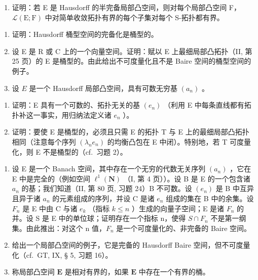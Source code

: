 \begin{enumerate}
\def\labelenumi{\arabic{enumi})}
\setcounter{enumi}{12}
\tightlist
\item
  证明：若 E 是 Hausdorff 的半完备局部凸空间，则对每个局部凸空间 F，\(\mathcal{L}(\mathrm{E};\mathrm{F})\) 中对简单收敛拓扑有界的每个子集对每个 S-拓扑都有界。
\end{enumerate}

\exercisegroup

\begin{enumerate}
\def\labelenumi{\arabic{enumi})}
\item
  证明：Hausdorff 桶型空间的完备化是桶型的。
\item
  设 E 是 R 或 C 上的一个向量空间。证明：赋以 E 上最细局部凸拓扑（II, 第 25 页）的 E 是桶型的。由此给出不可度量化且不是 Baire 空间的桶型空间的例子。
\item
  设 \(E\) 是一个 Hausdorff 局部凸空间，具有可数无穷基 \((a_{n})\) 。
\end{enumerate}

\begin{enumerate}
\def\labelenumi{\alph{enumi})}
\item
  证明：E 具有一个可数的、拓扑无关的基 \((e_n)\) （利用 E 中每条直线都有拓扑补这一事实，用归纳法定义诸 \(e_n\) ）。
\item
  证明：要使 E 是桶型的，必须且只需 E 的拓扑 T 与 E 上的最细局部凸拓扑相同（注意每个序列 \((\lambda_{n}e_{n})\) 的均衡凸包在 E 中闭）。特别地，若 T 可度量化，则 E 不是桶型的（cf.~习题 2）。
\end{enumerate}

\begin{enumerate}
\def\labelenumi{\arabic{enumi})}
\setcounter{enumi}{3}
\item
  设 E 是一个 Banach 空间，其中存在一个无穷的代数无关序列 \((a_{n})\) ，它在 E 中是完全的（例如空间 \(\ell^{1}(\mathbf{N})\) （I, 第 4 页））。设 B 是 E 的一个包含诸 \(a_{n}\) 的基；我们知道（II, 第 80 页, 习题 24）B 不可数。设 \((e_{n})\) 是 B 中互异且异于诸 \(a_{n}\) 的元素组成的序列，并设 C 是诸 \(e_{n}\) 组成的集在 B 中的余集。设 \(F_{n}\) 是 E 中由 C 与诸 \(e_{k}\) （指标 \(k \leqslant n\) ）生成的向量子空间；E 是诸 \(F_{n}\) 的并。设 S 是 E 中的单位球；证明存在一个指标 n，使得 \(S \cap F_{n}\) 不是第一纲集。由此推出：对这个 n 值，\(F_{n}\) 是一个可度量化的、非完备的 Baire 空间。
\item
  给出一个局部凸空间的例子，它是完备的 Hausdorff Baire 空间，但不可度量化（cf.~GT, IX, § 5, 习题 16）。
\item
  称局部凸空间 \(\mathbf{E}\) 是相对有界的，如果 \(\mathbf{E}\) 中存在一个有界的桶。
\end{enumerate}

